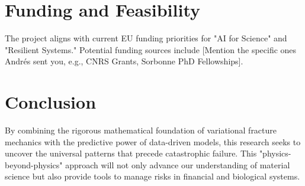 \documentclass[12pt]{article}
\begin{document}
\section{Funding and Feasibility}
The project aligns with current EU funding priorities for "AI for Science" and "Resilient Systems." Potential funding sources include [Mention the specific ones Andrés sent you, e.g., CNRS Grants, Sorbonne PhD Fellowships].

\section{Conclusion}
By combining the rigorous mathematical foundation of variational fracture mechanics with the predictive power of data-driven models, this research seeks to uncover the universal patterns that precede catastrophic failure. This "physics-beyond-physics" approach will not only advance our understanding of material science but also provide tools to manage risks in financial and biological systems.
\end{document}
